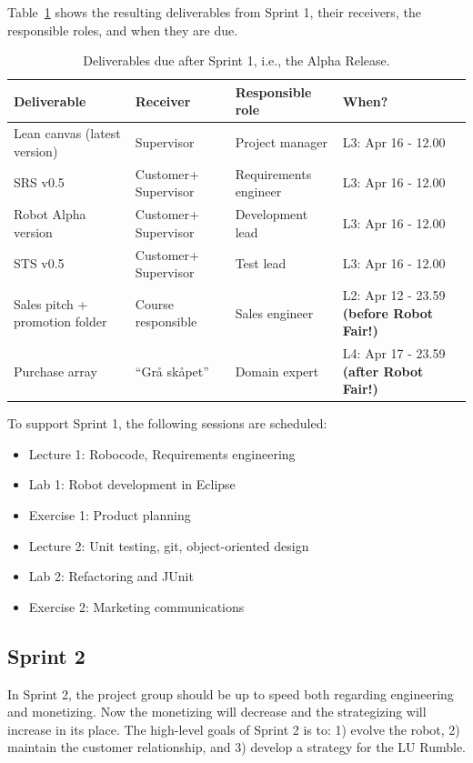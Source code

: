\documentclass{scrreprt}
\begin{document}
Table~\ref{tab:sprint1} shows the resulting deliverables from Sprint 1, their receivers, the responsible roles, and when they are due.

\begin{table}[] %
\centering
\caption{Deliverables due after Sprint 1, i.e., the Alpha Release.}
\label{tab:sprint1}
\begin{tabular}{|p{4cm}|p{2cm}|p{2.5cm}|p{4.5cm}|}
\hline
\textbf{Deliverable}           & \textbf{Receiver}   & \textbf{Responsible role} & \textbf{When?}     \\ \hline
Lean canvas (latest version)   & Supervisor          & Project manager           & L3: Apr 16 - 12.00 \\ \hline
SRS v0.5                       & Customer+ Supervisor & Requirements engineer     & L3: Apr 16 - 12.00 \\ \hline
Robot Alpha version            & Customer+ Supervisor & Development lead          & L3: Apr 16 - 12.00  \\ \hline
STS v0.5        			   & Customer+ Supervisor & Test lead                 & L3: Apr 16 - 12.00  \\ \hline
Sales pitch + promotion folder & Course responsible  & Sales engineer            & L2: Apr 12 - 23.59 \textbf{(before Robot Fair!)}\\ \hline
Purchase array                 & ``Grå skåpet''      & Domain expert             & L4: Apr 17 - 23.59 \textbf{(after Robot Fair!)} \\ \hline
\end{tabular}
\end{table}

\newpage

To support Sprint 1, the following sessions are scheduled:
\begin{itemize}
\item Lecture 1: Robocode, Requirements engineering
\item Lab 1: Robot development in Eclipse
\item Exercise 1: Product planning
\item Lecture 2: Unit testing, git, object-oriented design
\item Lab 2: Refactoring and JUnit
\item Exercise 2: Marketing communications
\end{itemize}

\subsection{Sprint 2}
In Sprint 2, the project group should be up to speed both regarding engineering and monetizing. Now the monetizing will decrease and the strategizing will increase in its place. The high-level goals of Sprint 2 is to: 1) evolve the robot, 2) maintain the customer relationship, and 3) develop a strategy for the LU Rumble.
\end{document}
